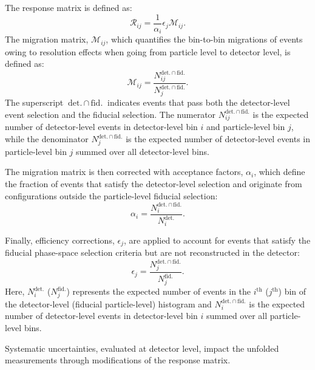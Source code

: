 \documentclass[cernpreprint, atlasdraft=false, texlive=2023, UKenglish, texmf, orcidlogo]{atlasdoc}
\begin{document}
 
The response matrix is defined as:
\begin{equation*}
\mathcal{R}_{ij} = \frac{1}{\alpha_i}\epsilon_{j}\mathcal{M}_{ij}.
\end{equation*}
The migration matrix, $\mathcal{M}_{ij}$, which quantifies the
bin-to-bin migrations of events owing to resolution effects when
going from particle level to detector level, is defined as:
\begin{equation*}
\mathcal{M}_{ij} = \frac{N_{ij}^{\text{det.}\,\cap\, \text{fid.}}}{N_j^{\text{det.}\,\cap\, \text{fid.}}}.
\end{equation*}
The superscript $\textrm{det.}\,\cap\, \text{fid.}$ indicates events that pass both the detector-level event selection and the fiducial selection. The numerator $N^{\textrm{det.}\,\cap\,\textrm{fid.}}_{ij}$ is the expected number of detector-level events in detector-level bin $i$ and particle-level bin $j$, while
the denominator $N_j^{\text{det.}\,\cap\, \text{fid.}}$ is the expected number of detector-level events in particle-level bin $j$ summed over all detector-level bins.
 
The migration matrix is then corrected with acceptance
factors, $\alpha_i$, which define the fraction of events
that satisfy the detector-level selection and originate from
configurations outside the particle-level fiducial selection:
\begin{equation*}
\alpha_i= \frac{N_i^{\text{det.}\,\cap\, \text{fid.}}}{N_i^{\text{det.}}}.
\end{equation*}
 
Finally, efficiency corrections, $\epsilon_j$, are applied
to account for events that satisfy the fiducial phase-space
selection criteria but are not reconstructed in the detector:
\begin{equation*}
\epsilon_j= \frac{N_j^{\text{det.}\,\cap\, \text{fid.}}}{N_j^\text{fid.}}.
\end{equation*}
Here, $N_i^\text{det.}$ ($N_j^\text{fid.}$) represents the expected number of events in the $i^{\mathrm{th}}$ ($j^{\mathrm{th}}$) bin of the detector-level (fiducial particle-level) histogram and $N_i^{\text{det.}\,\cap\, \text{fid.}}$ is the expected number of detector-level events in detector-level bin $i$ summed over all particle-level bins.
 
 
 
Systematic uncertainties, evaluated at detector level, impact the
unfolded \xs measurements through modifications of the response matrix.
 
\end{document}
